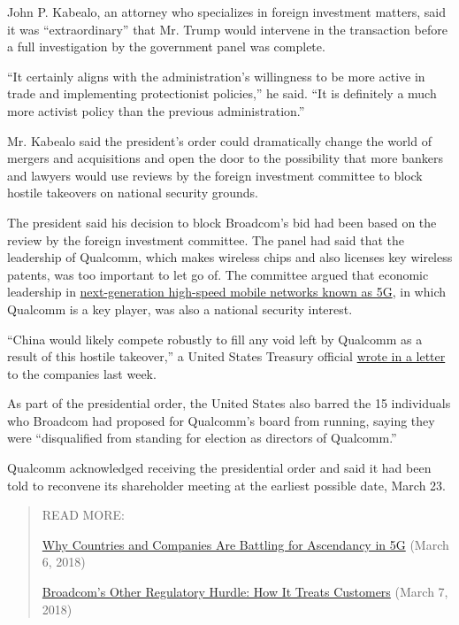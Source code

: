 John P. Kabealo, an attorney who specializes in foreign investment
matters, said it was ``extraordinary'' that Mr. Trump would intervene in
the transaction before a full investigation by the government panel was
complete.

``It certainly aligns with the administration's willingness to be more
active in trade and implementing protectionist policies,'' he said. ``It
is definitely a much more activist policy than the previous
administration.''

Mr. Kabealo said the president's order could dramatically change the
world of mergers and acquisitions and open the door to the possibility
that more bankers and lawyers would use reviews by the foreign
investment committee to block hostile takeovers on national security
grounds.

The president said his decision to block Broadcom's bid had been based
on the review by the foreign investment committee. The panel had said
that the leadership of Qualcomm, which makes wireless chips and also
licenses key wireless patents, was too important to let go of. The
committee argued that economic leadership in
\href{https://www.nytimes.com/2018/03/06/technology/companies-countries-battling-5g.html}{next-generation
high-speed mobile networks known as 5G}, in which Qualcomm is a key
player, was also a national security interest.

``China would likely compete robustly to fill any void left by Qualcomm
as a result of this hostile takeover,'' a United States Treasury
official
\href{https://www.qcomvalue.com/wp-content/uploads/2018/03/Letter-from-Treasury-Department-to-Broadcom-and-Qualcomm-regarding-CFIUS.pdf}{wrote
in a letter} to the companies last week.

As part of the presidential order, the United States also barred the 15
individuals who Broadcom had proposed for Qualcomm's board from running,
saying they were ``disqualified from standing for election as directors
of Qualcomm.''

Qualcomm acknowledged receiving the presidential order and said it had
been told to reconvene its shareholder meeting at the earliest possible
date, March 23.

\begin{quote}
READ MORE:

\href{https://www.nytimes.com/2018/03/06/technology/companies-countries-battling-5g.html}{Why
Countries and Companies Are Battling for Ascendancy in 5G} (March 6,
2018)

\href{https://www.nytimes.com/2018/03/07/technology/broadcom-qualcomm-customers.html}{Broadcom's
Other Regulatory Hurdle: How It Treats Customers} (March 7, 2018)
\end{quote}

